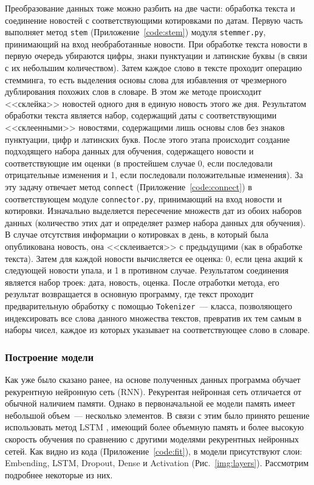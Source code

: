 \documentclass[14pt]{matmex-diploma-custom}
\begin{document}
Преобразование данных тоже можно разбить на две части: обработка текста и соединение новостей с соответствующими котировками по датам. Первую часть выполняет метод \texttt{stem} (Приложение~\ref{code:stem}) модуля \texttt{stemmer.py}, принимающий на вход необработанные новости. При обработке текста новости в первую очередь убираются цифры, знаки пунктуации и латинские буквы (в связи с их небольшим количеством). Затем каждое слово в тексте проходит операцию стемминга, то есть выделения основы слова для избавления от чрезмерного дублирования похожих слов в словаре. В этом же методе происходит <<склейка>> новостей одного дня в единую новость этого же дня. Результатом обработки текста является набор, содержащий даты с соответствующими <<склеенными>> новостями, содержащими лишь основы слов без знаков пунктуации, цифр и латинских букв. После этого этапа происходит создание подходящего набора данных для обучения, содержащего новости и соответствующие им оценки (в простейшем случае 0, если последовали отрицательные изменения и 1, если последовали положительные изменения). За эту задачу отвечает метод \texttt{connect} (Приложение~\ref{code:connect}) в соответствующем модуле \texttt{connector.py}, принимающий на вход новости и котировки. Изначально выделяется пересечение множеств дат из обоих наборов данных (количество этих дат и определяет размер набора данных для обучения). В случае отсутствия информации о котировках в день, в который была опубликована новость, она <<склеивается>> с предыдущими (как в обработке текста). Затем для каждой новости вычисляется ее оценка: 0, если цена акций к следующей новости упала, и 1 в противном случае. Результатом соединения является набор троек: дата, новость, оценка. После отработки метода, его результат возвращается в основную программу, где текст проходит предварительную обработку с помощью \texttt{Tokenizer}~--- класса, позволяющего индексировать все слова данного множества текстов, превратив их тем самым в наборы чисел, каждое из которых указывает на соответствующее слово в словаре.

\subsubsection{Построение модели}

Как уже было сказано ранее, на основе полученных данных программа обучает рекурентную нейронную сеть (RNN). Рекурентая нейронная сеть отличается от обычной наличием памяти. Однако в первоначальной ее модели память имеет небольшой объем~--- несколько элементов. В связи с этим было принято решение использовать метод LSTM \cite{tools:lstm}, имеющий более объемную память и более высокую скорость обучения по сравнению с другими моделями рекурентных нейронных сетей. Как видно из кода (Приложение~\ref{code:fit}), в модели присутствуют слои: Embending, LSTM, Dropout, Dense и Activation (Рис.~\ref{img:layers}). Рассмотрим подробнее некоторые из них.
\end{document}
